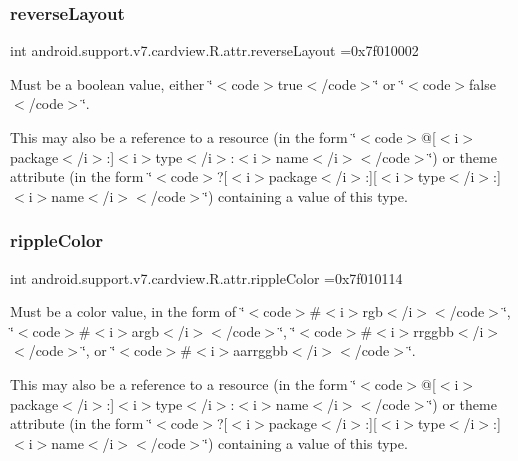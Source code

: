 \subsubsection{\texorpdfstring{reverse\+Layout}{reverseLayout}}
{\footnotesize\ttfamily int android.\+support.\+v7.\+cardview.\+R.\+attr.\+reverse\+Layout =0x7f010002\hspace{0.3cm}{\ttfamily [static]}}

Must be a boolean value, either \char`\"{}$<$code$>$true$<$/code$>$\char`\"{} or \char`\"{}$<$code$>$false$<$/code$>$\char`\"{}. 

This may also be a reference to a resource (in the form \char`\"{}$<$code$>$@\mbox{[}$<$i$>$package$<$/i$>$\+:\mbox{]}$<$i$>$type$<$/i$>$\+:$<$i$>$name$<$/i$>$$<$/code$>$\char`\"{}) or theme attribute (in the form \char`\"{}$<$code$>$?\mbox{[}$<$i$>$package$<$/i$>$\+:\mbox{]}\mbox{[}$<$i$>$type$<$/i$>$\+:\mbox{]}$<$i$>$name$<$/i$>$$<$/code$>$\char`\"{}) containing a value of this type. \mbox{\label{classandroid_1_1support_1_1v7_1_1cardview_1_1R_1_1attr_ae44c13dbe37d775ac8c669226c28d6cf}} 
\subsubsection{\texorpdfstring{ripple\+Color}{rippleColor}}
{\footnotesize\ttfamily int android.\+support.\+v7.\+cardview.\+R.\+attr.\+ripple\+Color =0x7f010114\hspace{0.3cm}{\ttfamily [static]}}

Must be a color value, in the form of \char`\"{}$<$code$>$\#$<$i$>$rgb$<$/i$>$$<$/code$>$\char`\"{}, \char`\"{}$<$code$>$\#$<$i$>$argb$<$/i$>$$<$/code$>$\char`\"{}, \char`\"{}$<$code$>$\#$<$i$>$rrggbb$<$/i$>$$<$/code$>$\char`\"{}, or \char`\"{}$<$code$>$\#$<$i$>$aarrggbb$<$/i$>$$<$/code$>$\char`\"{}. 

This may also be a reference to a resource (in the form \char`\"{}$<$code$>$@\mbox{[}$<$i$>$package$<$/i$>$\+:\mbox{]}$<$i$>$type$<$/i$>$\+:$<$i$>$name$<$/i$>$$<$/code$>$\char`\"{}) or theme attribute (in the form \char`\"{}$<$code$>$?\mbox{[}$<$i$>$package$<$/i$>$\+:\mbox{]}\mbox{[}$<$i$>$type$<$/i$>$\+:\mbox{]}$<$i$>$name$<$/i$>$$<$/code$>$\char`\"{}) containing a value of this type. \mbox{\label{classandroid_1_1support_1_1v7_1_1cardview_1_1R_1_1attr_abd1a6922795d8eb2f926d5ce77d1e192}} 
